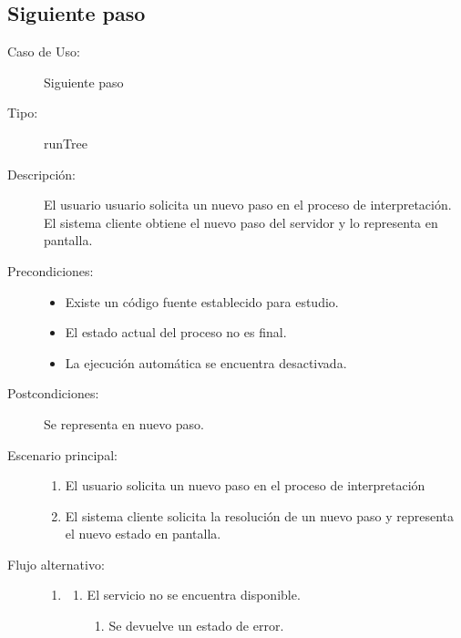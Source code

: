 \subsection{Siguiente paso} 
\begin{framed}
\FloatBarrier
\begin{description}
   \item[Caso de Uso:] Siguiente paso
   \item [Tipo:] runTree
   \item[Descripción:] 
   El usuario usuario solicita un nuevo paso en el proceso de interpretación. 
   El sistema cliente obtiene el nuevo paso del servidor y lo representa en pantalla.
   \item[Precondiciones:] \hfill 
   \begin{itemize}
   \item Existe un código fuente establecido para estudio. 
   \item El estado actual del proceso no es final.
   \item La ejecución automática se encuentra desactivada. 
   \end{itemize}
   \item[Postcondiciones:] 
   Se representa en nuevo paso. 
   \item[Escenario principal:] \hfill
   \begin{enumerate}
   \item El usuario solicita un nuevo paso en el proceso de interpretación
   \item El sistema cliente solicita la resolución de un nuevo paso y representa
   el nuevo estado en pantalla. 
   \end{enumerate}
   \item[Flujo alternativo:] \hfill 
   \begin{enumerate} \itemsep1pt \parskip0pt 
   \setcounter{enumi}{1}
   \renewcommand{\labelenumi}{}
   \renewcommand{\labelenumiii}{\arabic{enumiii}.}
   \renewcommand{\labelenumii}{\arabic{enumi}\alph{enumii}.}
      \item 
      \begin {enumerate}
         \setcounter{enumii}{0}
         \item El servicio no se encuentra disponible.
         \begin{enumerate}
         \item Se devuelve un estado de error.
         \end{enumerate}
      \end{enumerate}
   \end{enumerate}
\end{description}
 \FloatBarrier
\end{framed}

